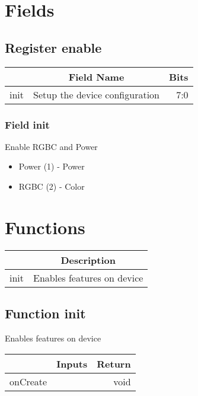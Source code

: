 \documentclass[a4paper,12pt,oneside,pdflatex,italian,final,twocolumn]{article}
\begin{document}
\raggedright

\section{Fields}



\raggedright

\subsection{Register enable}
\centering
\begin{tabular}{lcr}
\toprule
  & Field Name & Bits \\
\midrule
init & Setup the device configuration &
7:0
\\
\bottomrule

\end{tabular}


\raggedright

\subsubsection{Field init }

Enable RGBC and Power

\begin{itemize}
\item Power (1) - Power
\item RGBC (2) - Color
\end{itemize}




\raggedright

\section{Functions}

\centering
\begin{tabular}{lc}
\toprule
  & Description \\
\midrule
init & Enables features on device \\
\bottomrule
\end{tabular}


\raggedright
\subsection{Function init }
Enables features on device \\

\centering
\begin{tabular}{lcr}
\toprule
  & Inputs & Return \\
\midrule
onCreate &
&
void
\\
\bottomrule
\end{tabular}



\raggedright
\end{document}
